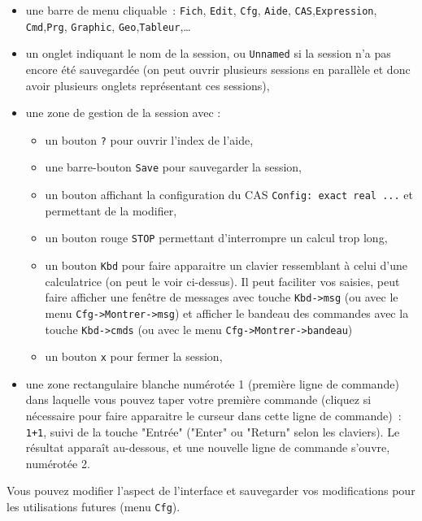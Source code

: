 \documentclass{article}
\begin{document}
\begin{itemize}
\item
une barre de menu cliquable~: \verb|Fich|, \verb|Edit|,
\verb|Cfg|, \verb|Aide|, \verb|CAS|,\verb|Expression|,
\verb|Cmd|,\verb|Prg|,
 \verb|Graphic|, \verb|Geo|,\verb|Tableur|,\ldots
{}
\item
un onglet indiquant le nom de la session, ou {\tt Unnamed} si la session n'a 
pas encore \'et\'e sauvegard\'ee (on peut ouvrir plusieurs sessions en 
parall\`ele et donc avoir plusieurs onglets repr\'esentant ces sessions),
\item une zone de gestion de la session avec :
\begin{itemize}
\item un bouton \verb|?| pour ouvrir l'index de l'aide,
\item une barre-bouton \verb|Save| pour sauvegarder la session, 
\item un bouton affichant la configuration du CAS
\verb|Config: exact real ...| et permettant de la modifier,
\item un bouton rouge \verb|STOP| permettant d'interrompre un calcul trop long,
\item un bouton \verb|Kbd| pour faire apparaitre un clavier ressemblant \`a 
celui d'une calculatrice (on peut le voir ci-dessus). Il peut faciliter vos 
saisies, peut faire afficher une fen\^etre de messages avec touche 
{\tt Kbd->msg} (ou avec le menu {\tt Cfg->Montrer->msg}) et afficher le bandeau 
des commandes avec la touche {\tt Kbd->cmds} (ou avec le menu 
{\tt Cfg->Montrer->bandeau}) 
\item  un bouton \verb|x| pour fermer la session,
\end{itemize}
\item
une zone rectangulaire blanche num\'erot\'ee 1 (premi\`ere ligne
de commande) dans laquelle vous pouvez taper
votre premi\`ere commande (cliquez si n\'ecessaire pour faire
apparaitre le curseur dans
cette ligne de commande)~: \verb|1+1|, suivi de la touche
"Entr\'ee" ("Enter" ou "Return" selon les claviers).
Le r\'esultat appara\^it au-dessous, et une nouvelle ligne de commande
s'ouvre, num\'erot\'ee 2. 
\end{itemize}
Vous pouvez modifier l'aspect de l'interface et sauvegarder vos
modifications pour les utilisations futures (menu \verb|Cfg|).
\end{document}

